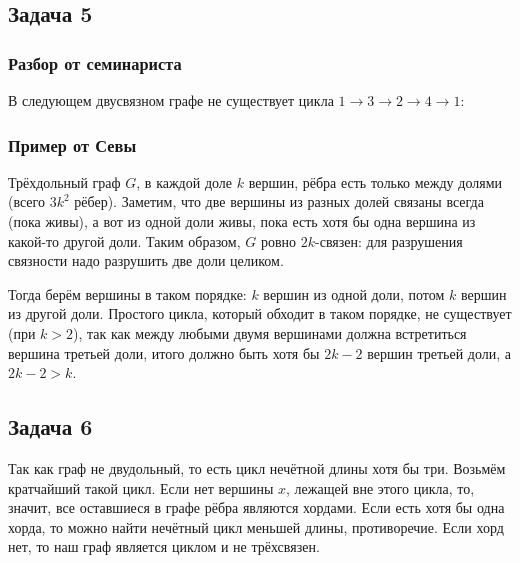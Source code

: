 \subsection{Задача 5}
	\subsubsection{Разбор от семинариста}
	В следующем двусвязном графе не существует цикла $1 \to 3 \to 2 \to 4 \to 1$:
	\begin{center}
	\end{center}
	
	\subsubsection{Пример от Севы}
	Трёхдольный граф $G$, в каждой доле $k$ вершин,
	рёбра есть только между долями (всего $3k^2$ рёбер).
	Заметим, что две вершины из разных долей связаны всегда (пока живы),
	а вот из одной доли живы, пока есть хотя бы одна вершина из какой-то другой доли.
	Таким образом, $G$ ровно $2k$-связен: для разрушения связности надо разрушить две доли целиком.

	Тогда берём вершины в таком порядке: $k$ вершин из одной доли, потом $k$ вершин из другой доли.
	Простого цикла, который обходит в таком порядке, не существует (при $k > 2$),
	так как между любыми двумя вершинами должна встретиться вершина третьей доли,
	итого должно быть хотя бы $2k-2$ вершин третьей доли, а $2k-2>k$.

\subsection{Задача 6}
	Так как граф не двудольный, то есть цикл нечётной длины хотя бы три.
	Возьмём кратчайший такой цикл.
	Если нет вершины $x$, лежащей вне этого цикла, то, значит, все оставшиеся
	в графе рёбра являются хордами.
	Если есть хотя бы одна хорда, то можно найти нечётный цикл меньшей длины, противоречие.
	Если хорд нет, то наш граф является циклом и не трёхсвязен.

